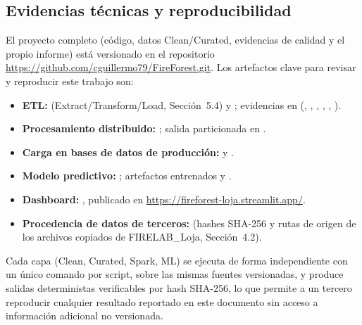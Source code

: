 \documentclass[11pt,a4paper]{article}
\begin{document}
\subsection{Evidencias t\'ecnicas y reproducibilidad}
\label{sec:evidencias}
El proyecto completo (c\'odigo, datos Clean/Curated, evidencias de calidad y el propio informe) est\'a versionado en el repositorio \url{https://github.com/cguillermo79/FireForest.git}. Los artefactos clave para revisar y reproducir este trabajo son:
\begin{itemize}\small
    \item \textbf{ETL:}  (Extract/Transform/Load, Secci\'on~5.4) y ; evidencias en  (, , , , , ).
    \item \textbf{Procesamiento distribuido:} ; salida particionada en .
    \item \textbf{Carga en bases de datos de producci\'on:}  y .
    \item \textbf{Modelo predictivo:} ; artefactos entrenados  y .
    \item \textbf{Dashboard:} , publicado en \url{https://fireforest-loja.streamlit.app/}.
    \item \textbf{Procedencia de datos de terceros:}  (hashes SHA-256 y rutas de origen de los archivos copiados de FIRELAB\_Loja, Secci\'on~4.2).
\end{itemize}
Cada capa (Clean, Curated, Spark, ML) se ejecuta de forma independiente con un \'unico comando por script, sobre las mismas fuentes versionadas, y produce salidas deterministas verificables por hash SHA-256, lo que permite a un tercero reproducir cualquier resultado reportado en este documento sin acceso a informaci\'on adicional no versionada.

\end{document}
